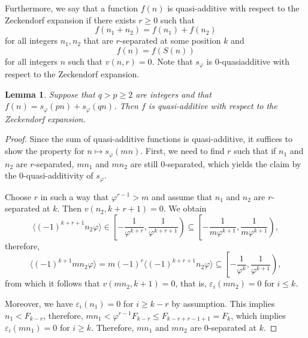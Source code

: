 \documentclass[12pt]{amsart}
\newtheorem{lemma}{Lemma}
\begin{document}
Furthermore, we say that a function $f(n)$ is quasi-additive with respect to the
Zeckendorf expansion if there exists $r\ge 0$ such that 
\[
f(n_1+n_2) = f(n_1) + f(n_2)
\]
for all integers $n_1,n_2$ that are $r$-separated at some position $k$ and 
\[
 f(n) = f(S(n))
\]
for all integers $n$ such that $v(n,r) = 0$.
Note that $s_\varphi$ is $0$-quasiadditive with respect to the Zeckendorf expansion.
\begin{lemma}\label{LeQA}
Suppose that  $q>p \geq 2$ are integers and that $f(n)=s_\varphi(pn)+s_\varphi(qn)$.
Then $f$ is quasi-additive with respect to the Zeckendorf expansion.
\end{lemma}

\begin{proof}
Since the sum of quasi-additive functions is quasi-additive,
it suffices to show the property for $n\mapsto s_\varphi(mn)$.
First, we need to find $r$ such that if $n_1$ and $n_2$ are $r$-separated, $mn_1$ and $mn_2$ are still $0$-separated, 
which yields the claim by the $0$-quasi-additivity of $s_\varphi$.

Choose $r$ in such a way that $\varphi^{r-1}>m$
and assume that $n_1$ and $n_2$ are $r$-separated at $k$.
Then $v(n_2,k+r+1)=0$. 
We obtain
\[\bigl\langle(-1)^{k+r+1} n_2 \varphi\bigr\rangle
\in\left[-\frac 1{\varphi^{k+r}},\frac 1{\varphi^{k+r+1}}\right)
\subseteq \left[-\frac 1{m\varphi^{k+1}},\frac 1{m\varphi^{k+1}}\right),
\]
therefore,
\[\bigl\langle(-1)^{k+1} mn_2 \varphi\bigr\rangle
=m(-1)^{r}\langle(-1)^{k+r+1} n_2 \varphi\bigr\rangle
\subseteq \left[-\frac 1{\varphi^{k}},\frac 1{\varphi^{k+1}}\right),
\]
from which it follows that $v(mn_2,k+1)=0$, that is, $\varepsilon_i(mn_2)=0$ for $i\leq k$.

Moreover, we have $\varepsilon_i(n_1)=0$ for $i\geq k-r$ by assumption.
This implies $n_1<F_{k-r}$, therefore, $mn_1<\varphi^{r-1}F_{k-r}\leq F_{k-r+r-1+1}=F_{k}$,
which implies $\varepsilon_i(mn_1)=0$ for $i\geq k$.
Therefore, $mn_1$ and $mn_2$ are $0$-separated at $k$.


\end{proof}
\end{document}
